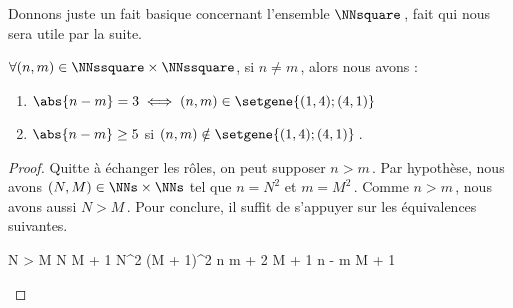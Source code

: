 Donnons juste un fait basique concernant l'ensemble $\NNsquare$\,, fait qui nous sera utile par la suite.




\begin{fact} \label{dist-square}
	$\forall (n, m) \in \NNssquare \times \NNssquare$, 
	si $n \neq m$\,, alors nous avons :
	\begin{enumerate}
		\item $\abs{n - m} = 3 \iff (n, m) \in \setgene{(1, 4) ; (4, 1)}$

		\item $\abs{n - m} \geq 5$ si $(n, m) \notin \setgene{(1, 4) ; (4, 1)}$\,.
	\end{enumerate}
\end{fact}

\begin{proof}
	Quitte à échanger les rôles, on peut supposer $n > m$\,.
	Par hypothèse, nous avons $(N, M) \in \NNs \times \NNs$ tel que $n = N^2$ et $m = M^2$\,.
	Comme $n > m$\,, nous avons aussi $N > M$\,. 
	Pour conclure, il suffit de s'appuyer sur les équivalences suivantes.
	
	\medskip
	
	\begin{stepcalc}[style = ar*, ope = \iff]
		N > M
	\explnext{}
		N \geq M + 1
	\explnext{}
		N^2 \geq (M + 1)^2
	\explnext{}
		n \geq m + 2 M + 1
	\explnext{}
		n - m  M + 1
	\end{stepcalc}
	
	\leavevmode
\end{proof}
